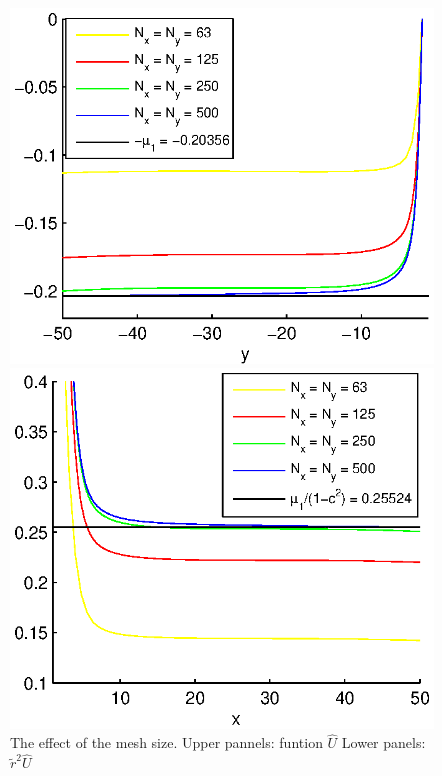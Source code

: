 \documentclass[12pt]{article}
\theoremstyle{theorem}
\theoremstyle{defi}
\begin{document}
\begin{figure}[ht]
\begin{minipage}[b]{0.5\linewidth}
	\end{minipage}
	\begin{minipage}[b]{0.5\linewidth}
		\raggedleft
		\includegraphics[width=\linewidth]{crossSectionX=0.eps}
	\end{minipage}	
	\begin{minipage}[b]{0.5\linewidth}
		\raggedright
		 \includegraphics[width=\linewidth]{crossSectionY=0.eps}
	\end{minipage}
	\caption{The effect of the mesh size. Upper pannels: funtion $\widehat{U}$  Lower panels: $\tilde r^2 \widehat{U}$ }
	\label{fig1}
\end{figure}
\end{document}
